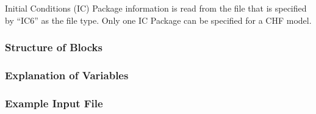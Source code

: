 Initial Conditions (IC) Package information is read from the file that is specified by ``IC6'' as the file type.  Only one IC Package can be specified for a CHF model. 

\vspace{5mm}
\subsubsection{Structure of Blocks}
%


\vspace{5mm}
\subsubsection{Explanation of Variables}
\begin{description}

\end{description}

\vspace{5mm}
\subsubsection{Example Input File}


